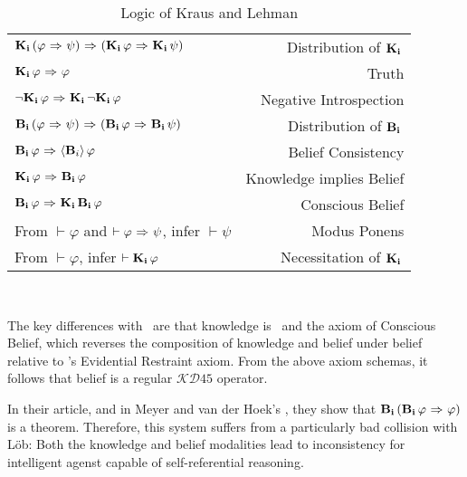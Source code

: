 \begin{table}[H]
	\begin{center}
		\begin{tabular}{| l r |}
			\hline
			$\mathbf{K}_{\mathbf{i}}\,(\varphi {\ \Rightarrow \ } \psi) {\ \Rightarrow \ } (\mathbf{K}_{\mathbf{i}}\,\varphi {\ \Rightarrow \ } \mathbf{K}_{\mathbf{i}}\,\psi)$ & Distribution of $\mathbf{K}_{\mathbf{i}}\,$ \\
			$\mathbf{K}_{\mathbf{i}}\,\varphi {\ \Rightarrow \ } \varphi$ & Truth \\
			${\neg}\mathbf{K}_{\mathbf{i}}\,\varphi {\ \Rightarrow \ } \mathbf{K}_{\mathbf{i}}\,{\neg}\mathbf{K}_{\mathbf{i}}\,\varphi$ & Negative Introspection \\
			$\mathbf{B}_{\mathbf{i}}\,(\varphi {\ \Rightarrow \ } \psi) {\ \Rightarrow \ } (\mathbf{B}_{\mathbf{i}}\,\varphi {\ \Rightarrow \ } \mathbf{B}_{\mathbf{i}}\,\psi)$ & Distribution of $\mathbf{B}_{\mathbf{i}}\,$\\
			$\mathbf{B}_{\mathbf{i}}\,\varphi {\ \Rightarrow \ } \langle \mathbf{B}_{i} \rangle\,\varphi$ & Belief Consistency \\
			$\mathbf{K}_{\mathbf{i}}\,\varphi {\ \Rightarrow \ } \mathbf{B}_{\mathbf{i}}\,\varphi$ & Knowledge implies Belief \\
			$\mathbf{B}_{\mathbf{i}}\,\varphi {\ \Rightarrow \ } \mathbf{K}_{\mathbf{i}}\,\mathbf{B}_{\mathbf{i}}\,\varphi$ & Conscious Belief\\
			From $\vdash \varphi$ and $\vdash \varphi {\ \Rightarrow \ } \psi$, infer $\vdash\psi$ & Modus Ponens\\
			From $\vdash \varphi$, infer $\vdash \mathbf{K}_{\mathbf{i}}\,\varphi$ & Necessitation of $\mathbf{K}_{\mathbf{i}}\,$\\
			\hline
		\end{tabular}
		\caption{Logic of Kraus and Lehman}~\label{KL}
	\end{center}
\end{table}

The key differences with \DASL\ are that knowledge is \SFive\ and the axiom of Conscious Belief, which reverses the composition of knowledge and belief under belief relative to \DASL's Evidential Restraint axiom. From the above axiom schemas, it follows that belief is a regular $\mathcal{KD}45$ operator.

In their article, and in Meyer and van der Hoek's \cite{MeyerHoek}, they show that $\mathbf{B}_{\mathbf{i}}\,(\mathbf{B}_{\mathbf{i}}\,\varphi {\ \Rightarrow \ } \varphi)$ is a theorem. Therefore, this system suffers from a particularly bad collision with L\"ob: Both the knowledge and belief modalities lead to inconsistency for intelligent agenst capable of self-referential reasoning. 

